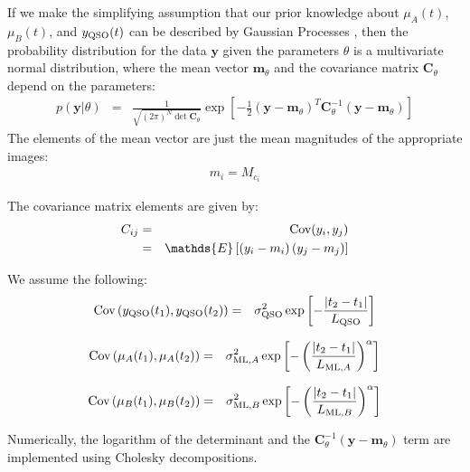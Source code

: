 \documentclass[a4paper, 10pt]{article}
\newcommand{\yy}{\mathbf{y}}
\newcommand{\mm}{\mathbf{m}_\theta}
\newcommand{\CC}{\mathbf{C}_\theta}
\begin{document}
If we make the simplifying assumption that our prior knowledge about
$\mu_A(t)$, $\mu_B(t)$, and
$y_{\rm QSO}(t)$ can be described by Gaussian Processes \citep{rasmussen},
then the probability distribution for the data $\yy$ given the parameters
$\theta$
is a multivariate normal distribution, where the mean vector $\mm$
and the covariance matrix $\CC$ depend on the parameters:
\begin{eqnarray}
p(\yy | \theta) &=& \frac{1}{\sqrt{(2\pi)^N\det{\CC}}}
\exp\left[
-\frac{1}{2}
\left(
\yy - \mm
\right)^T
\CC^{-1}
\left(
\yy - \mm
\right)
\right]
\end{eqnarray}
The elements of the mean vector are just the mean magnitudes of the
appropriate images:
\begin{eqnarray}
m_i = M_{c_i}
\end{eqnarray}

The covariance matrix elements are given by:
\begin{eqnarray}
C_{ij} &=& \textnormal{Cov}(y_i, y_j) \\
&=& \mathds{E}\left[
\left(y_i - m_i\right)
\left(y_j - m_j\right)
\right]
\end{eqnarray}

We assume the following:
\begin{eqnarray}
\textnormal{Cov}\left(y_{\rm QSO}(t_1), y_{\rm QSO}(t_2)\right)
&=& \sigma_{\rm QSO}^2\exp\left[-\frac{\left|t_2 - t_1\right|}{L_{\rm QSO}}\right]
\end{eqnarray}

\begin{eqnarray}
\textnormal{Cov}\left(\mu_A(t_1), \mu_A(t_2)\right)
&=& \sigma_{{\rm ML}, A}^2\exp\left[-\left(\frac{\left|t_2 - t_1\right|}{L_{{\rm ML}, A}}\right)^\alpha\right]
\end{eqnarray}

\begin{eqnarray}
\textnormal{Cov}\left(\mu_B(t_1), \mu_B(t_2)\right)
&=& \sigma_{{\rm ML}, B}^2\exp\left[-\left(\frac{\left|t_2 - t_1\right|}{L_{{\rm ML}, B}}\right)^\alpha\right]
\end{eqnarray}

Numerically, the logarithm of the determinant and the
$\CC^{-1}\left(\yy - \mm\right)$ term are implemented using
Cholesky decompositions.
\end{document}
